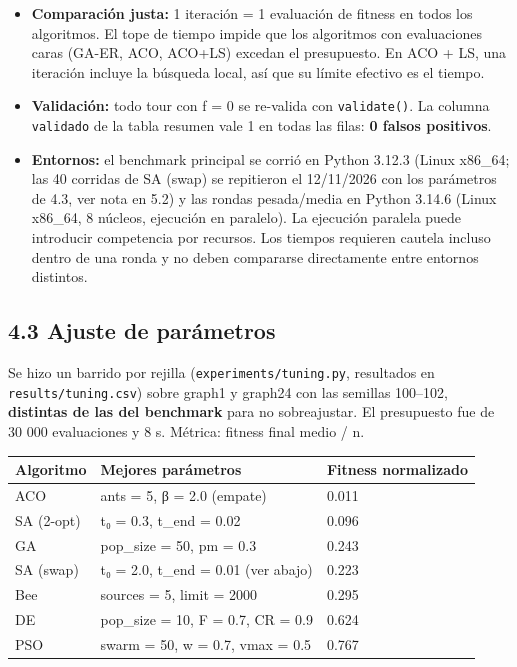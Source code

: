 \documentclass[
  spanish,
  12pt,
]{article}
\newcounter{none} %
\providecommand{\tightlist}{%
  \setlength{\itemsep}{0pt}\setlength{\parskip}{0pt}}
\begin{document}
\begin{itemize}
\tightlist
\item
  \textbf{Comparación justa:} 1 iteración = 1 evaluación de fitness en
  todos los algoritmos. El tope de tiempo impide que los algoritmos con
  evaluaciones caras (GA-ER, ACO, ACO+LS) excedan el presupuesto. En ACO
  + LS, una iteración incluye la búsqueda local, así que su límite
  efectivo es el tiempo.
\item
  \textbf{Validación:} todo tour con f = 0 se re-valida con
  \texttt{validate()}. La columna \texttt{validado} de la tabla resumen
  vale 1 en todas las filas: \textbf{0 falsos positivos}.
\item
  \textbf{Entornos:} el benchmark principal se corrió en Python 3.12.3
  (Linux x86\_64; las 40 corridas de SA (swap) se repitieron el
  12/11/2026 con los parámetros de 4.3, ver nota en 5.2) y las rondas
  pesada/media en Python 3.14.6 (Linux x86\_64, 8 núcleos, ejecución en
  paralelo). La ejecución paralela puede introducir competencia por recursos. Los tiempos requieren cautela incluso dentro de una ronda y no deben compararse directamente entre entornos distintos.
\end{itemize}

\subsection{4.3 Ajuste de parámetros}\label{ajuste-de-paruxe1metros}

Se hizo un barrido por rejilla (\texttt{experiments/tuning.py},
resultados en \texttt{results/tuning.csv}) sobre graph1 y graph24 con
las semillas 100--102, \textbf{distintas de las del benchmark} para no
sobreajustar. El presupuesto fue de 30 000 evaluaciones y 8 s. Métrica:
fitness final medio / n.

{\def\LTcaptype{none} %
\begin{longtable}[]{@{}lll@{}}
\toprule\noalign{}
Algoritmo & Mejores parámetros & Fitness normalizado \\
\midrule\noalign{}
\endhead
\bottomrule\noalign{}
\endlastfoot
ACO & ants = 5, β = 2.0 (empate) & 0.011 \\
SA (2-opt) & t₀ = 0.3, t\_end = 0.02 & 0.096 \\
GA & pop\_size = 50, pm = 0.3 & 0.243 \\
SA (swap) & t₀ = 2.0, t\_end = 0.01 (ver abajo) & 0.223 \\
Bee & sources = 5, limit = 2000 & 0.295 \\
DE & pop\_size = 10, F = 0.7, CR = 0.9 & 0.624 \\
PSO & swarm = 50, w = 0.7, vmax = 0.5 & 0.767 \\
\end{longtable}
}
\end{document}
